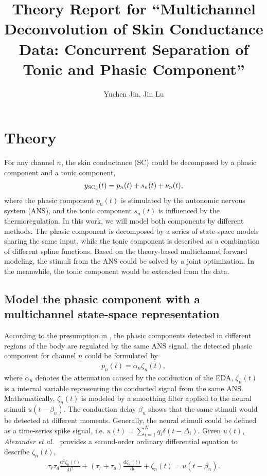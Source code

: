\documentclass[]{article}
\title{Theory Report for ``Multichannel Deconvolution of Skin Conductance Data: Concurrent Separation of Tonic and Phasic Component''}
\author{Yuchen Jin, Jin Lu}
\providecommand{\od}{\mathrm{d}}
\begin{document}
\maketitle

\section{Theory}

For any channel $n$, the skin conductance (SC) could be decomposed by a phasic component and a tonic component,
\begin{align}
  y_{\rm{SC}_n}(t) = p_n(t) + s_n(t) + \nu_n(t),
\end{align}
where the phasic component $p_n(t)$ is stimulated by the autonomic nervous system (ANS), and the tonic component $s_n(t)$ is influenced by the thermoregulation. In this work, we will model both components by different methods. The phasic component is decomposed by a series of state-space models sharing the same input, while the tonic component is described as a combination of different spline functions. Based on the theory-based multichannel forward modeling, the stimuli from the ANS could be solved by a joint optimization. In the meanwhile, the tonic component would be extracted from the data.

\subsection{Model the phasic component with a multichannel state-space representation}
According to the presumption in \cite{alexander2005separating,society2012publication,amin2019robust}, the phasic components detected in different regions of the body are regulated by the same ANS signal, the detected phasic component for channel $n$ could be formulated by
\begin{align}
  p_n(t) = \alpha_n \zeta_n (t),
\end{align}
where $\alpha_n$ denotes the attenuation caused by the conduction of the EDA, $\zeta_n(t)$ is a internal variable representing the conducted signal from the same ANS. Mathematically, $\zeta_n(t)$ is modeled by a smoothing filter applied to the neural stimuli $u(t-\beta_n)$. The conduction delay $\beta_n$ shows that the same stimuli would be detected at different moments. Generally, the neural stimuli could be defined as a time-series spike signal, i.e. $u(t) = \sum_{i=1}^N q_i \delta(t - \Delta_i)$. Given $u(t)$, \textit{Alexander et al.}~\cite{alexander2005separating} provides a second-order ordinary differential equation to describe $\zeta_n(t)$,
\begin{align} \label{fml:the:ode}
  \tau_r \tau_d \frac{\od^2 \zeta_n(t)}{\od t^2} + (\tau_r + \tau_d) \frac{\od \zeta_n(t)}{\od t} + \zeta_n(t) = u(t - \beta_n).
\end{align}
\end{document}
